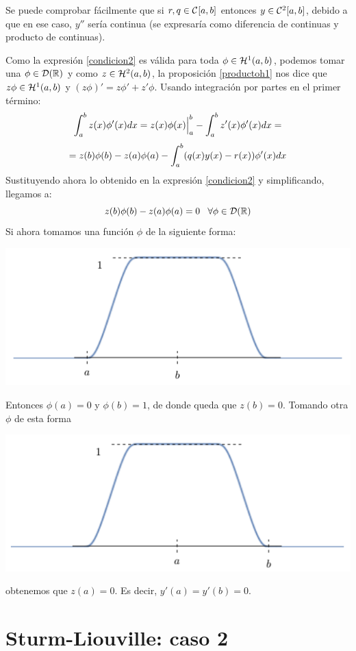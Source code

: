 Se puede comprobar fácilmente que si $r,q\in\continuas$ entonces $y\in\continuas[2]$, debido a que en ese caso, $y''$ sería continua (se expresaría como diferencia de continuas y producto de continuas).

Como la expresión \eqref{condicion2} es válida para toda $\phi\in\sobolev{1}$, podemos tomar una $\phi\in\mathcal{D}(\R)$ y como $z\in\sobolev{2}$, la proposición \ref{productoh1} nos dice que $z\phi\in\sobolev{1}$ y $\left(z\phi\right)'=z\phi'+z'\phi$. Usando integración por partes en el primer término:
\[
\integral{a}{b}{z(x)\phi'(x)dx}=z(x)\phi(x)\Big|_a^b-\integral{a}{b}{z'(x)\phi'(x)dx}=
\]
\[
=z(b)\phi(b)-z(a)\phi(a)-\integral{a}{b}{(q(x)y(x)-r(x))\phi'(x)dx}
\]
Sustituyendo ahora lo obtenido en la expresión \eqref{condicion2} y simplificando, llegamos a:
\[
z(b)\phi(b)-z(a)\phi(a)=0 \espacio \forall \phi \in\mathcal{D}(\R)
\]
Si ahora tomamos una función $\phi$ de la siguiente forma:

\centerline{\includegraphics[scale=0.5]{img/caso1.png}} 

Entonces $\phi(a)=0$ y $\phi(b)=1$, de donde queda que $z(b)=0$. Tomando otra $\phi$ de esta forma
\centerline{\includegraphics[scale=0.5]{img/caso2.png}} 

obtenemos que $z(a)=0$. Es decir, $y'(a)=y'(b)=0$.

\section{Sturm-Liouville: caso 2}

